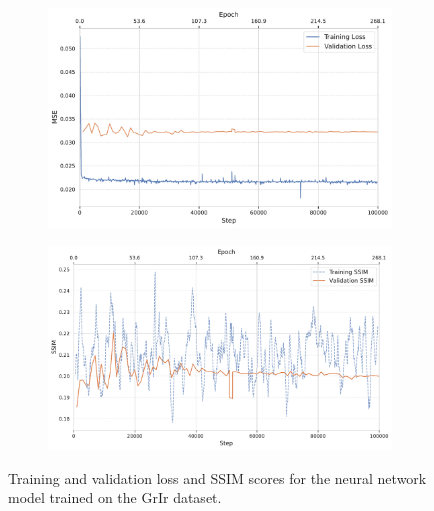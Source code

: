 \begin{figure}
    \centering

    \begin{subfigure}[b]{0.7\linewidth}
        \centering
        \includegraphics[width=1\linewidth]{images/loss_training_val.pdf}
        \caption{}
        \label{fig:loss-training-val}
    \end{subfigure}

    \begin{subfigure}[b]{0.7\linewidth}
        \centering
        \includegraphics[width=1\linewidth]{images/ssim_training_val.pdf}
        \caption{}
        \label{fig:ssim-training-val}
    \end{subfigure}

    \caption{Training and validation loss and \gls{SSIM} scores for the neural network model trained on the \gls{GrIr} dataset.}
    \label{fig:loss-ssim-training-val}
\end{figure}

